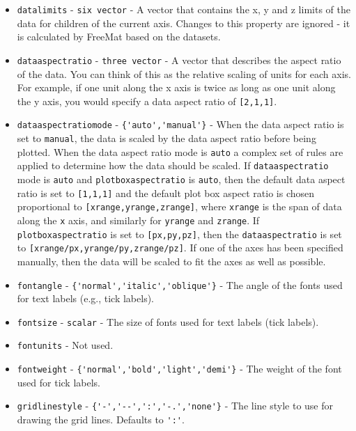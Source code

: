 \begin{itemize}
\item  \verb|datalimits| - \verb|six vector| - A vector that contains the x, y and z
 limits of the data for children of the current axis.  Changes to this
 property are ignored - it is calculated by FreeMat based on the datasets.

\item  \verb|dataaspectratio| - \verb|three vector| - A vector that describes the
 aspect ratio of the data.  You can think of this as the relative scaling of 
 units for each axis.  For example, if one unit along the x axis is twice
 as long as one unit along the y axis, you would specify a data aspect 
 ratio of \verb|[2,1,1]|.

\item  \verb|dataaspectratiomode| - \verb|{'auto','manual'}| - When the data aspect 
 ratio is set to \verb|manual|, the data is scaled by the data aspect ratio before
 being plotted.  When the data aspect ratio mode is \verb|auto| a complex set of
 rules are applied to determine how the data should be scaled.  If \verb|dataaspectratio|
 mode is \verb|auto| and \verb|plotboxaspectratio| is \verb|auto|, then the default data aspect
 ratio is set to \verb|[1,1,1]| and the default plot box aspect ratio is chosen proportional
 to \verb|[xrange,yrange,zrange]|, where \verb|xrange| is the span of data along the \verb|x|
 axis, and similarly for \verb|yrange| and \verb|zrange|.  If \verb|plotboxaspectratio| is set to
 \verb|[px,py,pz]|, then the \verb|dataaspectratio| is set to \verb|[xrange/px,yrange/py,zrange/pz]|.
 If one of the axes has been specified manually, then the data will be scaled to fit
 the axes as well as possible.

\item  \verb|fontangle| - \verb|{'normal','italic','oblique'}| - The angle of the fonts used
 for text labels (e.g., tick labels).

\item  \verb|fontsize| - \verb|scalar| - The size of fonts used for text labels (tick labels).

\item  \verb|fontunits| - Not used.

\item  \verb|fontweight| - \verb|{'normal','bold','light','demi'}| - The weight of the font used
 for tick labels.

\item  \verb|gridlinestyle| - \verb|{'-','--',':','-.','none'}| - The line style to use for 
 drawing the grid lines.  Defaults to \verb|':'|.


\end{itemize}
